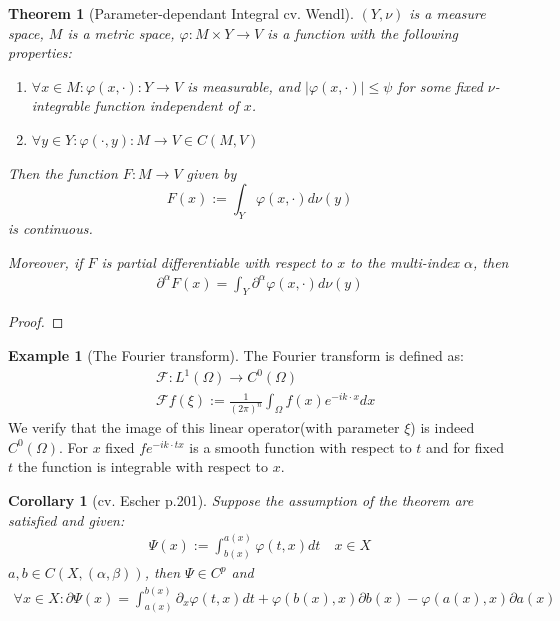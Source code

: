 \documentclass[12pt,fleqn]{book}
\newtheorem{theorem}{Theorem}[section]
\newtheorem{corollary}{Corollary}[theorem]
\theoremstyle{definition}
\newtheorem*{example}{Example}
\begin{document}
\begin{theorem}[Parameter-dependant Integral cv. Wendl]
$(Y, \nu)$ is a measure space, $M$ is a metric space, $\varphi: M \times Y \rightarrow V$ is a function with the following properties:
\begin{enumerate}
	\item $\forall x \in M: \varphi(x, \cdot): Y \rightarrow V$ is measurable, and $|\varphi(x, \cdot)|\leq \psi$ for some fixed $\nu$-integrable function independent of $x$.
	\item $\forall y \in Y: \varphi(\cdot, y): M \rightarrow V \in C(M, V)$
\end{enumerate}
Then the function $F: M \rightarrow V$ given by
\begin{equation*}
	F(x):= \int_Y \varphi(x, \cdot) d\nu(y)
\end{equation*}
is continuous.\par 
Moreover, if $F$ is partial differentiable with respect to $x$ to the multi-index $\alpha$, then
\begin{align*}
	\partial^\alpha F(x) = \int_Y \partial^\alpha \varphi(x, \cdot)d\nu(y)
\end{align*}
\end{theorem}
\begin{proof}
	
\end{proof}
\begin{example}[The Fourier transform]
The Fourier transform is defined as:
\begin{align*}
	&\mathcal{F}: L^1(\Omega) \rightarrow C^0(\Omega)\\
	&\mathcal{F}f (\xi):= \frac{1}{(2\pi)^n}\int_\Omega f(x) e^{-ik\cdot x}dx 
\end{align*}
We verify that the image of this linear operator(with parameter $\xi$) is indeed $C^0(\Omega)$. For $x$ fixed $f e^{-ik\cdot tx}$ is a smooth function with respect to $t$ and for fixed $t$ the function is integrable with respect to $x$. 
\end{example}


\begin{corollary}[cv. Escher p.201]
	Suppose the assumption of the theorem are satisfied and given:
	\begin{align*}
		\Psi(x) := \int^{a(x)}_{b(x)} \varphi(t, x)dt \quad x \in X
	\end{align*}
	$a, b \in C(X, (\alpha, \beta))$, then $\Psi \in C^p$ and 
	\begin{align*}
		\forall x \in X: \partial \Psi(x) 
		= \int_{a(x)}^{b(x)} \partial_x \varphi(t, x)dt + \varphi(b(x), x) \partial b(x) - \varphi(a(x), x) \partial a(x)
	\end{align*}
\end{corollary}
\end{document}
